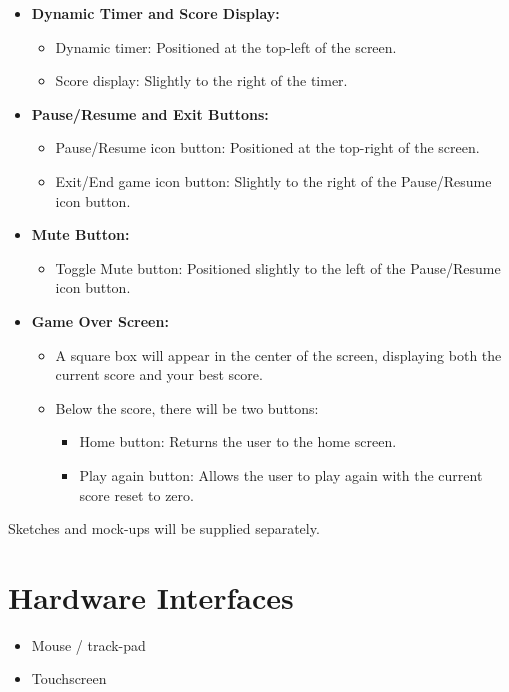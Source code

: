 \documentclass[11pt]{scrreprt}
\begin{document}
\begin{itemize}
\begin{itemize}
    \end{itemize}
  \item \textbf{Dynamic Timer and Score Display:}
    \begin{itemize}
        \item Dynamic timer: Positioned at the top-left of the screen.
        \item Score display: Slightly to the right of the timer.
    \end{itemize}
  \item \textbf{Pause/Resume and Exit Buttons:}
    \begin{itemize}
        \item Pause/Resume icon button: Positioned at the top-right of the screen.
        \item Exit/End game icon button: Slightly to the right of the Pause/Resume icon button.
    \end{itemize}
  \item \textbf{Mute Button:}
    \begin{itemize}
        \item Toggle Mute button: Positioned slightly to the left of the Pause/Resume icon button.
    \end{itemize}
  \item \textbf{Game Over Screen:}
    \begin{itemize}
        \item A square box will appear in the center of the screen, displaying both the current score and your best score.
        \item Below the score, there will be two buttons: 
        \begin{itemize}
            \item Home button: Returns the user to the home screen.
            \item Play again button: Allows the user to play again with the current score reset to zero.
        \end{itemize}
    \end{itemize}
\end{itemize}

Sketches and mock-ups will be supplied separately.

\section{Hardware Interfaces}
\begin{itemize}
  \item Mouse / track-pad
  \item Touchscreen
\end{itemize}
\end{document}
